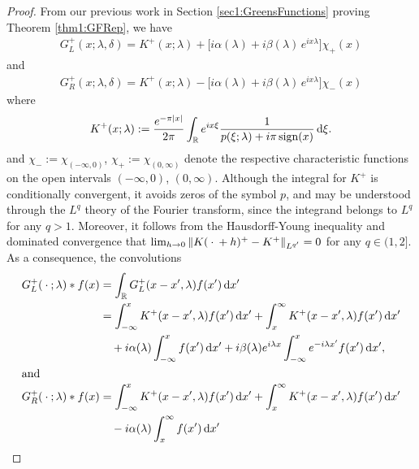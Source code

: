 \documentclass[../dissertation]{subfiles}
\begin{document}
\begin{proof}
	From our previous work in Section 
	\ref{sec1:GreensFunctions} proving Theorem \ref{thm1:GFRep}, we have
	\begin{align}
		G_L^+(x; \lambda, \delta) 
			= 
				K^+(x; \lambda) 
				+ 
					\big[
						i \alpha(\lambda) + i \beta(\lambda)\, e^{ix\lambda} 
					\big] \chi_+(x)
	\end{align}
	and
	\begin{align}
		G_R^+(x; \lambda, \delta) 
			= 
				K^+(x; \lambda) 
				- 
					\big[
						i \alpha(\lambda) + i \beta(\lambda)\, e^{ix\lambda} 
					\big] \chi_-(x)
	\end{align}
	where 
	\begin{align*}
		K^+(x; \lambda) 
				:= \frac{e^{-\pi |x|}}{2\pi} 
					\int_{\mathbb R} e^{i x \xi} 
						\frac{1}{p(\xi; \lambda) + i \pi \sign(x)}
					\, \mathrm{d}\xi.
	\end{align*}
	and $\chi_-:= \chi_{(-\infty, 0)}$, $\chi_+:= \chi_{(0, \infty)}$ denote 
	\label{sym2:chipm}the respective characteristic functions on the open 
	intervals $(-\infty, 0)$, $(0, \infty)$. 
	Although the integral for $K^+$ is conditionally convergent, it avoids 
	zeros of the symbol $p$, and may be understood through the $L^q$ theory 
	of the Fourier transform, since the integrand belongs to $L^q$ for any 
	$q>1$.  Moreover, it follows from the 
	Hausdorff-Young inequality and dominated convergence that 
	$\lim_{h \to 0} \norm[L^{q'}]{K(\dotarg+h)^+ - K^+} =0$ for any $q \in (1,2]$. 
	As a consequence, the convolutions
	\begin{align}
		\label{ILW.GL*f}
		G_L^+(\dotarg; \lambda) * f(x) 	
			&=	\int_{\mathbb R} G_L^+(x-x',\lambda) f(x') \, \mathrm{d}x' 	\\
			&=	
				\int_{-\infty}^x K^+(x-x',\lambda) f(x') \, \mathrm{d}x'
				+\int_x^{\infty} K^+(x-x',\lambda) f(x') \, \mathrm{d}x'
				\nonumber \\
			&\quad 	+ i \alpha (\lambda) \int_{-\infty}^x f(x') \, \mathrm{d}x' 
				+ i \beta(\lambda) e^{i\lam x} 
						\int_{-\infty}^x e^{-i\lambda x'} f(x') \, \mathrm{d}x', 
				\nonumber\\
		\intertext{and}
		\label{ILW.GR*f}
		G_R^+(\dotarg; \lambda) * f(x) 
			&= 
				\int_{-\infty}^x K^+(x-x',\lambda) f(x') \, \mathrm{d}x'
				+\int_x^{\infty} K^+(x-x',\lambda) f(x') \, \mathrm{d}x'
				\\
			&\quad- i \alpha (\lambda) \int_x^{\infty} f(x') \, \mathrm{d}x' 

\end{align}
\end{proof}
\end{document}

